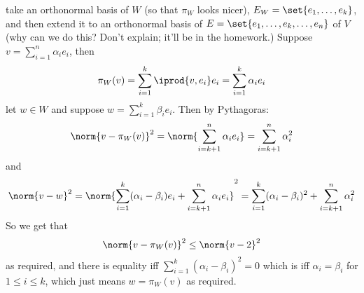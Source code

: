 \Proof take an orthonormal basis of $W$ (so that $\pi_W$ looks nicer), $E_W=\set{e_1,\dots,e_k}$, and then extend it to an orthonormal basis of $E=\set{e_1,\dots,e_k,\dots,e_n}$ of $V$ (why can we do this?
Don't explain; it'll be in the homework.)
Suppose $v=\sum_{i=1}^n\alpha_ie_i$, then
$$ \pi_W(v) = \sum_{i=1}^k\iprod{v,e_i}e_i = \sum_{i=1}^k\alpha_ie_i $$
let $w\in W$ and suppose $w=\sum_{i=1}^k\beta_ie_i$.
Then by Pythagoras:
$$ \norm{v-\pi_W(v)}^2 = \norm{\sum_{i=k+1}^n\alpha_ie_i} = \sum_{i=k+1}^n\alpha_i^2 $$
and
$$ \norm{v-w}^2 = \norm{\sum_{i=1}^k(\alpha_i-\beta_i)e_i+\sum_{i=k+1}^n\alpha_ie_i}^2 = \sum_{i=1}^k(\alpha_i-\beta_i)^2 + \sum_{i=k+1}^n\alpha_i^2 $$
So we get that
$$ \norm{v-\pi_W(v)}^2 \leq \norm{v-2}^2 $$
as required, and there is equality iff $\sum_{i=1}^k(\alpha_i-\beta_i)^2=0$ which is iff $\alpha_i=\beta_i$ for $1\leq i\leq k$, which just means $w=\pi_W(v)$ as required.
\qqed

\bye


